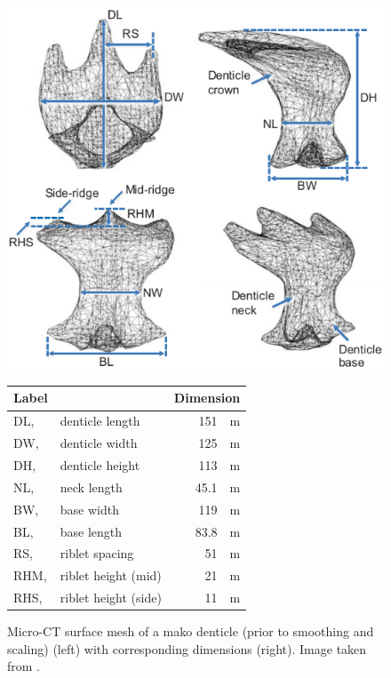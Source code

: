 \documentclass[12pt,oneside,a4paper]{article}
\begin{document}
\begin{figure}[!b]
	\begin{minipage}{0.5\linewidth}
	\includegraphics[width=\linewidth]{images/litReview/makoScaleOfWen.png}
	\end{minipage}
%
	\begin{minipage}{0.5\linewidth}
	\begin{tabular}{l l r}
	\hline
	Label &  & Dimension 		\\
	\hline
	\small DL, &denticle length						& \SI{151}{\mu m}	\\
	\small DW, &denticle width						&\SI{125}{\mu m}	\\
	\small DH, &denticle height						& \SI{113}{\mu m}	\\
	\small NL, &neck length							& \SI{45.1}{\mu m}	\\
	\small BW, &base width							& \SI{119}{\mu m}\\
	\small BL, &base length							& \SI{83.8}{\mu m}	\\
	\small RS, &riblet spacing						&	\SI{51}{\mu m}	\\
	\small RHM, &riblet height (mid)				&	\SI{21}{\mu m}	\\
	\small RHS, &riblet height (side)				&	\SI{11}{\mu m}	\\
	\hline	
	\end{tabular}
	\end{minipage}
\caption{Micro-CT surface mesh of a mako denticle (prior to smoothing and scaling) (left) with corresponding dimensions (right). Image taken from \cite{wen2014}.}
\label{figure:litReview:makoScaleWen}
\end{figure}
\end{document}
